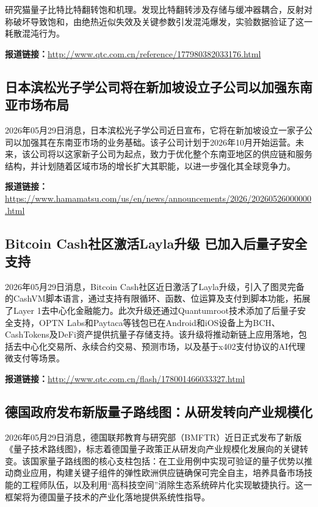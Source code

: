 \documentclass[12pt,a4paper]{ctexart}
\begin{document}
研究猫量子比特比特翻转饱和机理。发现比特翻转涉及存储与缓冲器耦合，反射对称破坏导致饱和，由绝热近似失效及关键参数引发混沌爆发，实验数据验证了这一耗散混沌行为。

\noindent\textbf{报道链接：}\url{http://www.qtc.com.cn/reference/177980382033176.html}

\subsection{ 日本滨松光子学公司将在新加坡设立子公司以加强东南亚市场布局 }

2026年05月29日消息，日本滨松光子学公司近日宣布，它将在新加坡设立一家子公司以加强其在东南亚市场的业务基础。该子公司计划于2026年10月开始运营。未来，该公司将以这家新子公司为起点，致力于优化整个东南亚地区的供应链和服务结构，并计划随着区域市场的增长扩大其职能，以进一步强化其全球竞争力。

\noindent\textbf{报道链接：}\url{https://www.hamamatsu.com/us/en/news/announcements/2026/20260526000000.html}

\subsection{ Bitcoin Cash社区激活Layla升级 已加入后量子安全支持 }

2026年05月29日消息，Bitcoin Cash社区近日激活了Layla升级，引入了图灵完备的CashVM脚本语言，通过支持有限循环、函数、位运算及支付到脚本功能，拓展了Layer 1去中心化金融能力。此次升级还通过Quantumroot技术添加了后量子安全支持，OPTN Labs和Paytaca等钱包已在Android和iOS设备上为BCH、CashTokens及DeFi资产提供抗量子存储支持。该升级将推动新链上应用落地，包括去中心化交易所、永续合约交易、预测市场，以及基于x402支付协议的AI代理微支付等场景。

\noindent\textbf{报道链接：}\url{http://www.qtc.com.cn/flash/178001466033327.html}

\subsection{ 德国政府发布新版量子路线图：从研发转向产业规模化 }

2026年05月29日消息，德国联邦教育与研究部（BMFTR）近日正式发布了新版《量子技术路线图》，标志着德国量子政策正从研发向产业规模化发展向的关键转变。该国家量子路线图的核心支柱包括：在工业用例中实现可验证的量子优势以推动商业应用，构建关键子组件的弹性欧洲供应链确保可完全自主，培养具备市场技能的工程师队伍，以及利用“高科技空间”消除生态系统碎片化实现敏捷执行。这一框架将为德国量子技术的产业化落地提供系统性指导。
\end{document}
